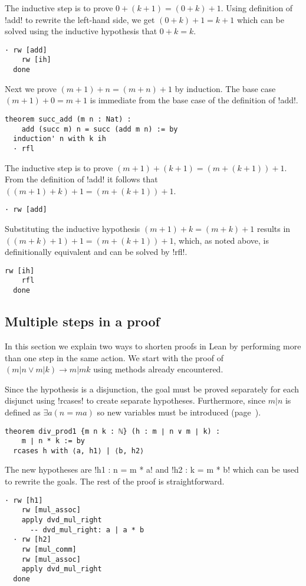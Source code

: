 The inductive step is to prove $0+(k+1)=(0+k)+1$. Using definition of !add! to rewrite the left-hand side, we get $(0+k)+1=k+1$ which can be solved using the inductive hypothesis that $0+k=k$.
\begin{Verbatim}[firstnumber=last]
  · rw [add]
    rw [ih]
  done
\end{Verbatim}

Next we prove $(m+1)+n = (m+n)+1$ by induction. The base case $(m+1)+0=m+1$ is immediate from the base case of the definition of !add!.
\begin{Verbatim}[firstnumber=last]
theorem succ_add (m n : Nat) :
    add (succ m) n = succ (add m n) := by
  induction' n with k ih
  · rfl
\end{Verbatim}

The inductive step is to prove $(m+1) + (k+1) = (m + (k+1)) + 1$. From the definition of !add! it follows that $((m+1) + k) + 1 = (m + (k+1)) + 1$.
\begin{Verbatim}[firstnumber=last]
  · rw [add]
\end{Verbatim}
Substituting the inductive hypothesis $(m+1) + k = (m+k) + 1$ results in $((m+k) + 1) + 1 = (m + (k+1)) + 1$, which, as noted above, is definitionally equivalent and can be solved by !rfl!.
\begin{Verbatim}[firstnumber=last]
    rw [ih]
    rfl
  done
\end{Verbatim}

\subsection{Multiple steps in a proof}

In this section we explain two ways to shorten proofs in Lean by performing more than one step in the same action. We start with the proof of $(m|n \vee m|k) \rightarrow m | mk$ using methods already encountered.

Since the hypothesis is a disjunction, the goal must be proved separately for each disjunct using !rcases! to create separate hypotheses. Furthermore, since $m|n$ is defined as $\exists a (n=ma)$ so new variables must be introduced (page~\pageref{p.rcases}).
\begin{Verbatim}
theorem div_prod1 {m n k : ℕ} (h : m ∣ n ∨ m ∣ k) :
    m ∣ n * k := by
  rcases h with ⟨a, h1⟩ | ⟨b, h2⟩
\end{Verbatim}
The new hypotheses are !h1 : n = m * a! and !h2 : k = m * b! which can be used to rewrite the goals. The rest of the proof is straightforward.
\begin{Verbatim}[firstnumber=last]
  · rw [h1]
    rw [mul_assoc]
    apply dvd_mul_right
      -- dvd_mul_right: a | a * b
  · rw [h2]
    rw [mul_comm]
    rw [mul_assoc]
    apply dvd_mul_right
  done
\end{Verbatim}

